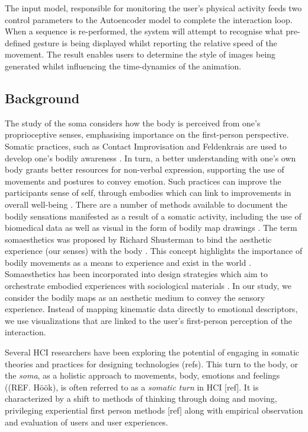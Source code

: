 The input model, responsible for monitoring the user’s physical activity feeds two control parameters to the Autoencoder model to complete the interaction loop. When a sequence is re-performed, the system will attempt to recognise what pre-defined gesture is being displayed whilst reporting the relative speed of the movement. The result enables users to determine the style of images being generated whilst influencing the time-dynamics of the animation.

\subsection{Background}

The study of the soma considers how the body is perceived from one's proprioceptive senses, emphasising importance on the first-person perspective\cite{hook_embracing_2018}. Somatic practices, such as Contact Improvisation and Feldenkrais are used to develop one’s bodily awareness \cite{tsaknaki_teaching_2019}. In turn, a better understanding with one's own body grants better resources for non-verbal expression, supporting the use of movements and postures to convey emotion. Such practices can improve the participants sense of self, through embodies which can link to improvements in overall well-being \cite{samaritter_aesthetic_2018}. There are a number of methods available to document the bodily sensations manifested as a result of a somatic activity, including the use of biomedical data \cite{hook_soma_2019} as well as visual in the form of bodily map drawings \cite{windlin_soma_2019}. The term somaesthetics was proposed by Richard Shusterman to bind the aesthetic experience (our senses) with the body \cite{hook_somaesthetic_2016}. This concept highlights the importance of bodily movements as a means to experience and exist in the world \cite{shusterman_body_2008}. Somaesthetics has been incorporated into design strategies which aim to orchestrate embodied experiences with sociological materials \cite{tsaknaki_teaching_2019}. In our study, we consider the bodily maps as an aesthetic medium to convey the sensory experience. Instead of mapping kinematic data directly to emotional descriptors, we use visualizations that are linked to the user's first-person perception of the interaction. 

Several HCI researchers have been exploring the potential of engaging in somatic theories and practices for designing technologies (refs). This turn to the body, or the \textit{soma}, as a holistic approach to movements, body, emotions and feelings ((REF. Höök), is often referred to as a \textit{somatic turn} in HCI [ref]. It is characterized by a shift to methods of thinking through doing and moving, privileging experiential first person methods [ref] along with empirical observation and evaluation of users and user experiences. 

